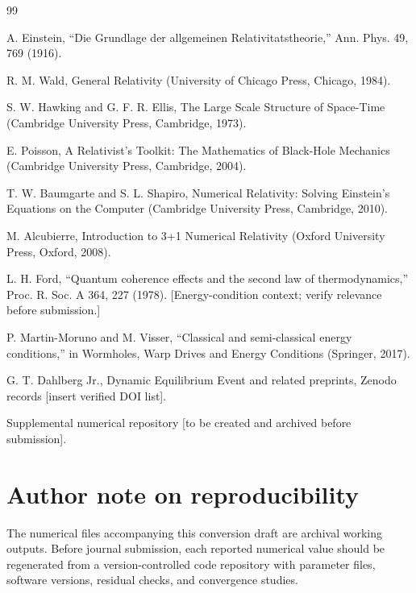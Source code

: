 \documentclass[aps,prd,preprint,nofootinbib,superscriptaddress]{revtex4-2}
\begin{document}
\begin{thebibliography}{99}

 A. Einstein, ``Die Grundlage der allgemeinen Relativitatstheorie,'' Ann. Phys. 49, 769 (1916).

 R. M. Wald, General Relativity (University of Chicago Press, Chicago, 1984).

 S. W. Hawking and G. F. R. Ellis, The Large Scale Structure of Space-Time (Cambridge University Press, Cambridge, 1973).

 E. Poisson, A Relativist's Toolkit: The Mathematics of Black-Hole Mechanics (Cambridge University Press, Cambridge, 2004).

 T. W. Baumgarte and S. L. Shapiro, Numerical Relativity: Solving Einstein's Equations on the Computer (Cambridge University Press, Cambridge, 2010).

 M. Alcubierre, Introduction to 3+1 Numerical Relativity (Oxford University Press, Oxford, 2008).

 L. H. Ford, ``Quantum coherence effects and the second law of thermodynamics,'' Proc. R. Soc. A 364, 227 (1978). [Energy-condition context; verify relevance before submission.]

 P. Martin-Moruno and M. Visser, ``Classical and semi-classical energy conditions,'' in Wormholes, Warp Drives and Energy Conditions (Springer, 2017).

 G. T. Dahlberg Jr., Dynamic Equilibrium Event and related preprints, Zenodo records [insert verified DOI list].

 Supplemental numerical repository [to be created and archived before submission].

\end{thebibliography}

\section*{Author note on reproducibility}
The numerical files accompanying this conversion draft are archival working outputs. Before journal submission, each reported numerical value should be regenerated from a version-controlled code repository with parameter files, software versions, residual checks, and convergence studies.
\end{document}
